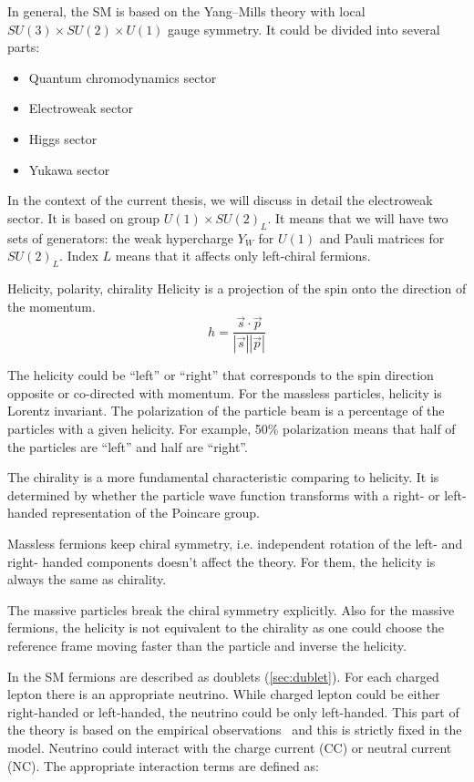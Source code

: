 \documentclass[../main.tex]{subfiles}
\begin{document}
In general, the SM is based on the Yang–Mills theory with local $SU(3)\times SU(2)\times U(1)$ gauge symmetry. It could be divided into several parts:
\begin{itemize}
  \item Quantum chromodynamics sector
  \item Electroweak sector
  \item Higgs sector
  \item Yukawa sector
\end{itemize}

In the context of the current thesis, we will discuss in detail the electroweak sector. It is based on group $U(1)\times SU(2)_L$. It means that we will have two sets of generators: the weak hypercharge $Y_W$ for $U(1)$ and Pauli matrices for $SU(2)_L$. Index $L$ means that it affects only left-chiral fermions.

\begin{bclogo}[couleur=blue!2, arrondi=0.1, logo=\bcinfo, nobreak=true]{Helicity, polarity, chirality}
Helicity is a projection of the spin onto the direction of the momentum.
\begin{equation}
h=\frac{\vec{s}\cdot\vec{p}}{\left|\vec{s}\right|\left|\vec{p}\right|}
\end{equation}

The helicity could be ``left'' or ``right'' that corresponds to the spin direction opposite or co-directed with momentum. For the massless particles, helicity is Lorentz invariant. The polarization of the particle beam is a percentage of the particles with a given helicity. For example, 50\% polarization means that half of the particles are ``left'' and half are ``right''.

The chirality is a more fundamental characteristic comparing to helicity. It is determined by whether the particle wave function transforms with a right- or left-handed representation of the Poincare group.

Massless fermions keep chiral symmetry, i.e. independent rotation of the left- and right- handed components doesn't affect the theory. For them, the helicity is always the same as chirality.

The massive particles break the chiral symmetry explicitly. Also for the massive fermions, the helicity is not equivalent to the chirality as one could choose the reference frame moving faster than the particle and inverse the helicity.
\end{bclogo}

In the SM fermions are described as doublets (\autoref{sec:dublet}). For each charged lepton there is an appropriate neutrino. While charged lepton could be either right-handed or left-handed, the neutrino could be only left-handed. This part of the theory is based on the empirical observations~\cite{Goldhaber1958} and this is strictly fixed in the model. Neutrino could interact with the charge current (CC) or neutral current (NC). The appropriate interaction terms are defined as:
\end{document}
